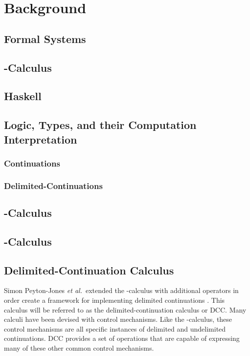\chapter{Background}

\section{Formal Systems}

\section{\lam-Calculus}

\section{Haskell}

\section{Logic, Types, and their Computation Interpretation}
\subsection{Continuations}
\subsection{Delimited-Continuations}

\section{\lmu-Calculus}

\section{\ltry-Calculus}

\section{Delimited-Continuation Calculus}

Simon Peyton-Jones \textit{et al.}\ extended the \lam-calculus with additional operators in order create a framework for implementing delimited continuations \cite{JonesDS07}. This calculus will be referred to as the delimited-continuation calculus or DCC. Many calculi have been devised with control mechanisms. Like the \lmu-calculus, these control mechanisms are all specific instances of delimited and undelimited continuations. DCC provides a set of operations that are capable of expressing many of these other common control mechanisms.

